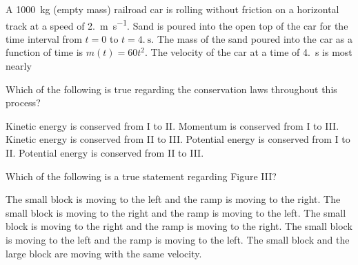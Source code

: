 \documentclass{../../oss-classkick-exam}
\begin{document}
\begin{multicols*}{2}
\begin{questions}
    \question A \SI{1000}{\kilo\gram} (empty mass) railroad car is rolling
    without friction on a horizontal track at a speed of
    \SI{2.}{\metre\per\second}. Sand is poured into the open top of the car for
    the time interval from $t=0$ to $t=\SI{4.}\second$. The mass of the sand
    poured into the car as a function of time is $m(t)=60t^2$. The velocity of
    the car at a time of \SI{4.}{\second} is most nearly
    

    \question Which of the following is true regarding the conservation laws
    throughout this process?
    \label{ramps1}
    \begin{choices}
      \choice Kinetic energy is conserved from I to II.
      \choice Momentum is conserved from I to III.
      \choice Kinetic energy is conserved from II to III.
      \choice Potential energy is conserved from I to II.
      \choice Potential energy is conserved from II to III.
    \end{choices}
    \vspace{.7in}
    
    \question Which of the following is a true statement regarding Figure III?
    \label{ramps2}
    \begin{choices}
      \choice The small block is moving to the left and the ramp is moving to
      the right.
      \choice The small block is moving to the right and the ramp is moving
      to the left.
      \choice The small block is moving to the right and the ramp is moving
      to the right.
      \choice The small block is moving to the left and the ramp is moving to
      the left.
      \choice The small block and the large block are moving with the same
      velocity.
    \end{choices}
    \vspace{.7in}
    

\end{questions}
\end{multicols*}
\end{document}

